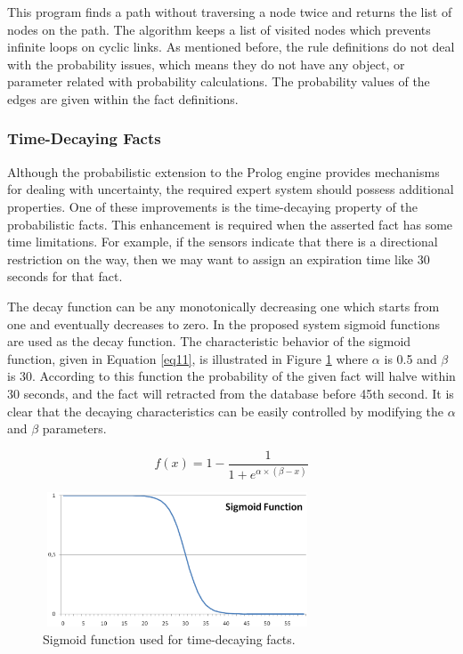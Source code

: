\documentclass[a4paper,oneside,12pt]{report}
\begin{document}
This program finds a path without traversing a node twice and returns the list of nodes on the path. The algorithm keeps a list of visited nodes which prevents infinite loops on cyclic links. As mentioned before, the rule definitions do not deal with the probability issues, which means they do not have any object, or parameter related with probability calculations. The probability values of the edges are given within the fact definitions.
\subsubsection{Time-Decaying Facts}
Although the probabilistic extension to the Prolog engine provides mechanisms for dealing with uncertainty, the required expert system should possess additional properties. One of these improvements is the time-decaying property of the probabilistic facts. This enhancement is required when the asserted fact has some time limitations. For example, if the sensors indicate that there is a directional restriction on the way, then we may want to assign an expiration time like 30 seconds for that fact. 

The decay function can be any monotonically decreasing one which starts from one and eventually decreases to zero. In the proposed system sigmoid functions are used as the decay function. The characteristic behavior of the sigmoid function, given in Equation \ref{eq11}, is illustrated in Figure \ref{fig:sigmoid} where $\alpha$ is 0.5 and $\beta$ is 30. According to this function the probability of the given fact will halve within 30 seconds, and the fact will retracted from the database before 45th second. It is clear that the decaying characteristics can be easily controlled by modifying the $\alpha$ and $\beta$ parameters.

\begin{equation}
\label{eq11}
f(x) = 1- \frac{1}{1+e^{\alpha\times(\beta-x)}}
\end{equation}

\begin{figure}[ht]
\begin{center}
\includegraphics[width=80mm,height=40mm]{img/sigmoid.eps}
\caption{Sigmoid function used for time-decaying facts.}
\label{fig:sigmoid}
\end{center}
\end{figure}
\end{document}
